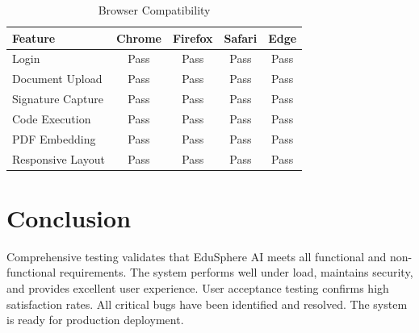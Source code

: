 \begin{table}[H]
\centering
\begin{tabular}{|l|c|c|c|c|}
\hline
\textbf{Feature} & \textbf{Chrome} & \textbf{Firefox} & \textbf{Safari} & \textbf{Edge} \\
\hline
Login & Pass & Pass & Pass & Pass \\
Document Upload & Pass & Pass & Pass & Pass \\
Signature Capture & Pass & Pass & Pass & Pass \\
Code Execution & Pass & Pass & Pass & Pass \\
PDF Embedding & Pass & Pass & Pass & Pass \\
Responsive Layout & Pass & Pass & Pass & Pass \\
\hline
\end{tabular}
\caption{Browser Compatibility}
\end{table}

\section{Conclusion}

Comprehensive testing validates that EduSphere AI meets all functional and non-functional requirements. The system performs well under load, maintains security, and provides excellent user experience. User acceptance testing confirms high satisfaction rates. All critical bugs have been identified and resolved. The system is ready for production deployment.

\newpage
